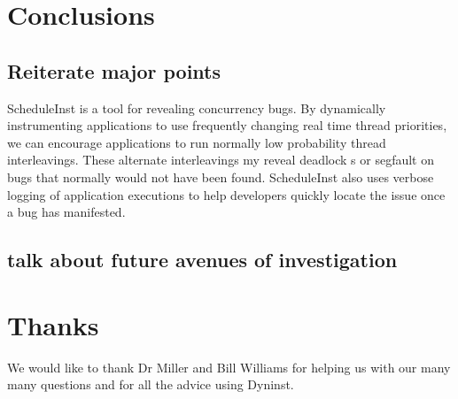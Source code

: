 \documentclass[10pt,]{article} %
\begin{document}
\section{Conclusions}


\subsection{Reiterate major points}
ScheduleInst is a tool for revealing concurrency bugs. By dynamically instrumenting applications to use frequently changing real time thread priorities, we can encourage applications to run normally low probability thread interleavings. These alternate interleavings my reveal deadlock s or segfault on bugs that normally would not have been found. ScheduleInst also uses verbose logging of application executions to help developers quickly locate the issue once a bug has manifested. 

\subsection{talk about future avenues of investigation}


\section{Thanks}

We would like to thank Dr Miller and Bill Williams for helping us with our many many questions and for all the advice using Dyninst. 
\end{document}
